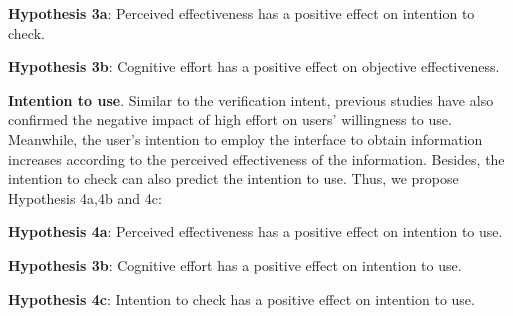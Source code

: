 \textbf{Hypothesis 3a}:
Perceived effectiveness has a positive effect on intention to check.

\textbf{Hypothesis 3b}:
Cognitive effort has a positive effect on objective effectiveness.

\textbf{Intention to use}.
Similar to the verification intent, previous studies have also confirmed the negative impact of high effort on users' willingness to use\cite[]{venkatesh2003user}.
Meanwhile, the user's intention to employ the interface to obtain information increases according to the perceived effectiveness of the information.
Besides, the intention to check can also predict the intention to use.
Thus, we propose Hypothesis 4a,4b and 4c:

\textbf{Hypothesis 4a}:
Perceived effectiveness has a positive effect on intention to use.

\textbf{Hypothesis 3b}:
Cognitive effort has a positive effect on intention to use.

\textbf{Hypothesis 4c}:
Intention to check has a positive effect on intention to use.
